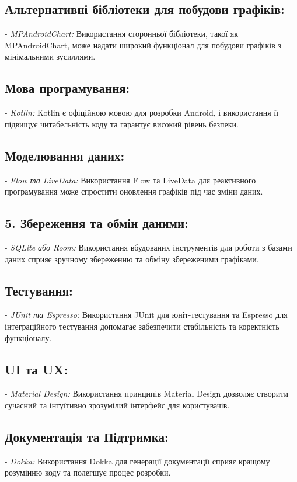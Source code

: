 \documentclass[14pt]{article}
\begin{document}
        \subsection{Альтернативні бібліотеки для побудови графіків:}
           - \textit{MPAndroidChart:} Використання сторонньої бібліотеки, такої як MPAndroidChart, може надати широкий функціонал для побудови графіків з мінімальними зусиллями.
        
        \subsection{Мова програмування:}
           - \textit{Kotlin:} Kotlin є офіційною мовою для розробки Android, і використання її підвищує читабельність коду та гарантує високий рівень безпеки.
        
        \subsection{Моделювання даних:}
           - \textit{Flow та LiveData:} Використання Flow та LiveData для реактивного програмування може спростити оновлення графіків під час зміни даних.
        
        \subsection{5. Збереження та обмін даними:}
           - \textit{SQLite або Room:} Використання вбудованих інструментів для роботи з базами даних сприяє зручному збереженню та обміну збереженими графіками.
        
        \subsection{Тестування:}
           - \textit{JUnit та Espresso:} Використання JUnit для юніт-тестування та Espresso для інтеграційного тестування допомагає забезпечити стабільність та коректність функціоналу.
        
        \subsection*{UI та UX:}
           - \textit{Material Design:} Використання принципів Material Design дозволяє створити сучасний та інтуїтивно зрозумілий інтерфейс для користувачів.
        
        \subsection*{Документація та Підтримка:}
           - \textit{Dokka:} Використання Dokka для генерації документації сприяє кращому розумінню коду та полегшує процес розробки.
        
\end{document}
